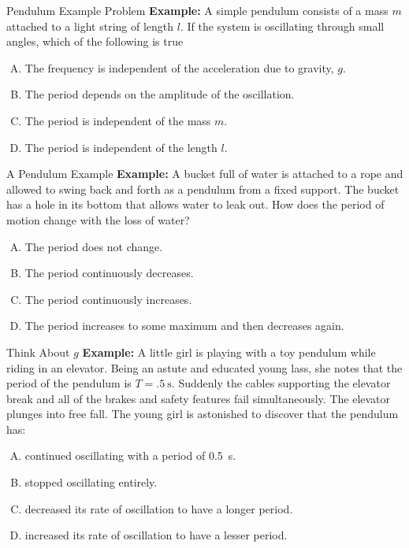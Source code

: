 \documentclass[12pt,compress,aspectratio=169]{beamer}
\begin{document}
\begin{frame}{Pendulum Example Problem}
  \textbf{Example:} A simple pendulum consists of a mass $m$ attached to a
  light string of length $l$. If the system is oscillating through small
  angles, which of the following is true
  \begin{enumerate}[(A)]
  \item The frequency is independent of the acceleration due to gravity, $g$.
  \item The period depends on the amplitude of the oscillation.
  \item The period is independent of the mass $m$.
  \item The period is independent of the length $l$.
  \end{enumerate}
\end{frame}



\begin{frame}{A Pendulum Example}
  \textbf{Example:} A bucket full of water is attached to a rope and allowed
  to swing back and forth as a pendulum from a fixed support. The bucket has a
  hole in its bottom that allows water to leak out. How does the period of
  motion change with the loss of water?
  \begin{enumerate}[(A)]
  \item The period does not change.
  \item The period continuously decreases.
  \item The period continuously increases.
  \item The period increases to some maximum and then decreases again.
  \end{enumerate}
\end{frame}



\begin{frame}{Think About $g$}
  \textbf{Example:} A little girl is playing with a toy pendulum while riding
  in an elevator. Being an astute and educated young lass, she notes that the 
  period of the pendulum is $T=\SI{.5}\second$. Suddenly the cables
  supporting the elevator break and all  of the brakes and safety features fail
  simultaneously. The elevator plunges into free fall. The young girl is
  astonished to discover that the pendulum has:
  \begin{enumerate}[(A)]
  \item continued oscillating with a period of \SI{.5}\second.
  \item stopped oscillating entirely.
  \item decreased its rate of oscillation to have a longer period.
  \item increased its rate of oscillation to have a lesser period.
  \end{enumerate}
\end{frame}
\end{document}
